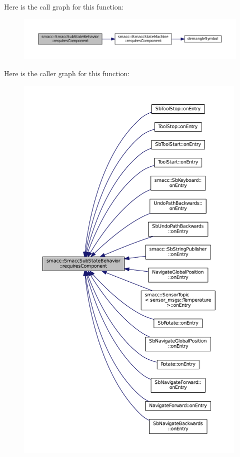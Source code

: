 Here is the call graph for this function\+:
\nopagebreak
\begin{figure}[H]
\begin{center}
\leavevmode
\includegraphics[width=350pt]{classsmacc_1_1SmaccSubStateBehavior_a4d25c4ba8ec01c489df172a71bb1c37d_cgraph}
\end{center}
\end{figure}




Here is the caller graph for this function\+:
\nopagebreak
\begin{figure}[H]
\begin{center}
\leavevmode
\includegraphics[height=550pt]{classsmacc_1_1SmaccSubStateBehavior_a4d25c4ba8ec01c489df172a71bb1c37d_icgraph}
\end{center}
\end{figure}




